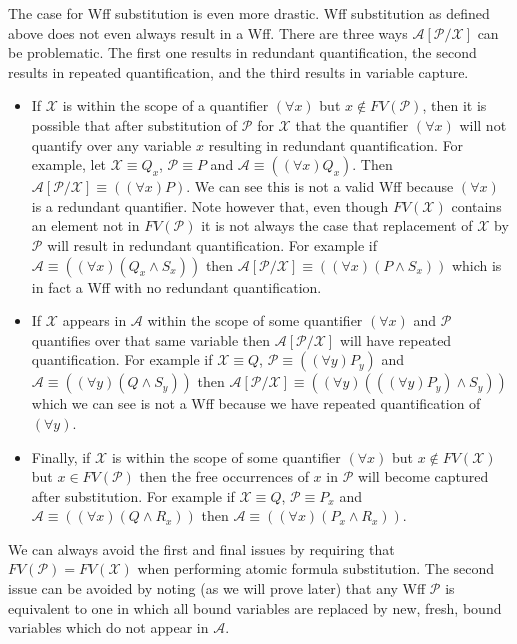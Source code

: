 \documentclass[12pt]{article}
\newcommand{\mc}[1]{\mathcal{#1}}
\begin{document}
The case for Wff substitution is even more drastic.
Wff substitution as defined above does not even always result in a Wff.
There are three ways $\mc{A}[\mc{P}/\mc{X}]$ can be problematic.
The first one results in redundant quantification, the second results in repeated quantification, and the third results in variable capture.

\begin{itemize}
\item{If $\mc{X}$ is within the scope of a quantifier $(\forall x)$ but $x\not \in FV(\mc{P})$, then it is possible that after substitution of $\mc{P}$ for $\mc{X}$ that the quantifier $(\forall x)$ will not quantify over any variable $x$ resulting in redundant quantification. For example, let $\mc{X} \equiv Q_x$, $\mc{P} \equiv P$ and $\mc{A} \equiv ((\forall x) Q_x)$. Then $\mc{A}[\mc{P}/\mc{X}] \equiv ((\forall x) P)$. We can see this is not a valid Wff because $(\forall x)$ is a redundant quantifier. Note however that, even though $FV(\mc{X})$ contains an element not in $FV(\mc{P})$ it is not always the case that replacement of $\mc{X}$ by $\mc{P}$ will result in redundant quantification. For example if $\mc{A} \equiv ((\forall x)(Q_x \land S_x))$ then $\mc{A}[\mc{P}/\mc{X}] \equiv ((\forall x)(P\land S_x))$ which is in fact a Wff with no redundant quantification.}
\item{If $\mc{X}$ appears in $\mc{A}$ within the scope of some quantifier $(\forall x)$ and $\mc{P}$ quantifies over that same variable then $\mc{A}[\mc{P}/\mc{X}]$ will have repeated quantification. For example if $\mc{X} \equiv Q$, $\mc{P} \equiv ((\forall y) P_y)$ and $\mc{A} \equiv ((\forall y) (Q\land S_y))$ then $\mc{A}[\mc{P}/\mc{X}] \equiv ((\forall y)(((\forall y)P_y)\land S_y))$ which we can see is not a Wff because we have repeated quantification of $(\forall y)$.}
\item{Finally, if $\mc{X}$ is within the scope of some quantifier $(\forall x)$ but $x\not \in FV(\mc{X})$ but $x\in FV(\mc{P})$ then the free occurrences of $x$ in $\mc{P}$ will become captured after substitution. For example if $\mc{X} \equiv Q$, $\mc{P} \equiv P_x$ and $\mc{A} \equiv ((\forall x) (Q\land R_x))$ then $\mc{A} \equiv ((\forall x)(P_x\land R_x))$.}
\end{itemize}

We can always avoid the first and final issues by requiring that $FV(\mc{P}) = FV(\mc{X})$ when performing atomic formula substitution.
The second issue can be avoided by noting (as we will prove later) that any Wff $\mc{P}$ is equivalent to one in which all bound variables are replaced by new, fresh, bound variables which do not appear in $\mc{A}$.
\end{document}
